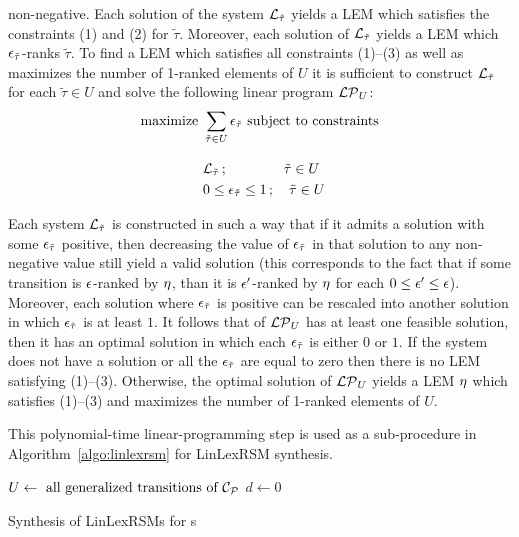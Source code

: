   non-negative. Each solution of the system $\mathcal{L}_{\tilde{\tau}}$ yields 
  a LEM which satisfies the constraints (1) and (2) for $\tilde{\tau}$. 
  Moreover, each solution of $\mathcal{L}_{\tilde{\tau}}$ yields a LEM which 
  $\epsilon_{\tilde{\tau}}$-ranks $\tilde{\tau}$. To find a LEM which satisfies all 
  constraints (1)--(3) as well as maximizes the number of 1-ranked elements of 
  $U$ it is sufficient to construct $\mathcal{L}_{\tilde{\tau}}$ for each 
  $\tilde{\tau}\in U$ and solve the following linear program $\mathcal{LP}_{U}$:
  \begin{align*}
\text{maximize }  &\sum_{\tilde{\tau} \in U} \epsilon_{\tilde\tau} \text{ subject to constraints}\\[0.3cm]
&\mathcal{L}_{\tilde{\tau}}\,;\quad\quad \quad\quad\tilde{\tau}\in U\\
&0 \leq \epsilon_{\tilde{\tau}} \leq 1\,; \quad \tilde{\tau}\in U
  \end{align*}
  
Each system $\mathcal{L}_{\tilde{\tau}}$ is constructed in such a way that if it 
admits a solution with some $\epsilon_{\tilde{\tau}}$ positive, then decreasing the 
value of $\epsilon_{\tilde{\tau}}$ in that solution to any non-negative value still 
yield a valid solution (this corresponds to the fact that if some transition is 
$\epsilon$-ranked by $\eta$, than it is $\epsilon'$-ranked by $\eta$ for each $0\leq 
\epsilon'\leq \epsilon$). Moreover, each solution where $\epsilon_{\tilde{\tau}}$ is 
positive can be rescaled into another solution in which $\epsilon_{\tilde{\tau}}$ 
is at least $1$. It follows that of $\mathcal{LP}_{U}$ has at least one feasible 
solution, then it has an optimal solution in which each $\epsilon_{\tilde{\tau}}$ 
is either $0$ or $1$. If the system does not have a solution or all the 
$\epsilon_{\tilde{\tau}}$ are equal to zero then there is no LEM satisfying 
(1)--(3). Otherwise, the optimal solution of $\mathcal{LP}_{U}$ yields a LEM $\eta$ 
which satisfies (1)--(3) and maximizes the number of 1-ranked elements of $U$.

This polynomial-time linear-programming step is used as a sub-procedure in Algorithm~\ref{algo:linlexrsm} for LinLexRSM synthesis. 

\begin{algorithm}
\DontPrintSemicolon

$U \leftarrow \text{ all generalized transitions of } \mathcal{C}_{\mathcal{P}}$\;
$d\leftarrow 0$\;
\caption{Synthesis of LinLexRSMs for \APP{}s}
\label{algo:linlexrsm}
\end{algorithm}

